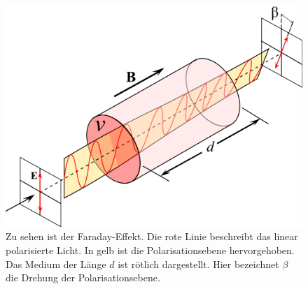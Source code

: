 \begin{figure}
    \centering
    \includegraphics[width=12cm]{fotos/FaradayEffekt.png}
    \caption{Zu sehen ist der Faraday-Effekt. Die rote Linie beschreibt das linear polarisierte Licht. In gelb ist die Polarisationsebene hervorgehoben. Das Medium der Länge $d$ ist rötlich dargestellt. Hier bezeichnet $\beta$ die Drehung der Polarisationsebene. \cite{Faraday}}
    \label{fig:FaradayEffekt}    
\end{figure}